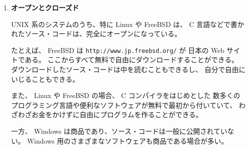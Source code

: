 \begin{enumerate}
\item \textbf{オープンとクローズド}

UNIX 系のシステムのうち、特に Linux や FreeBSD は、
C 言語などで書かれたソース・コードは、完全にオープンになっている。

たとえば、 FreeBSD は \texttt{http://www.jp.freebsd.org/} が
日本の Web サイトである。
ここからすべて無料で自由にダウンロードすることができる。
ダウンロードしたソース・コードは中を読むこともできるし、
自分で自由にいじることもできる。

また、 Linux や FreeBSD の場合、 C コンパイラをはじめとした
数多くのプログラミング言語や便利なソフトウェアが無料で最初から付いていて、
わざわざお金をかけずに自由にプログラムを作ることができる。

一方、 Windows は商品であり、ソース・コードは一般に公開されていない。
 Windows 用のさまざまなソフトウェアも商品である場合が多い。
\end{enumerate}
